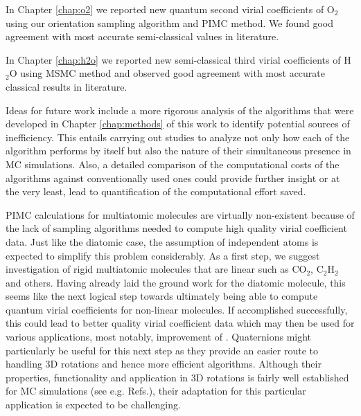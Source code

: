     In Chapter \ref{chap:o2} we reported new quantum second virial coefficients of O$_2$ using our orientation sampling algorithm and PIMC method. We found good agreement with most accurate semi-classical values in literature.

    In Chapter \ref{chap:h2o} we reported new semi-classical third virial coefficients of H$_2$O using MSMC method and observed good agreement with most accurate classical results in literature.

    Ideas for future work include a more rigorous analysis of the algorithms that were developed in Chapter \ref{chap:methods} of this work to identify potential sources of inefficiency. This entails carrying out studies to analyze not only how each of the algorithm performs by itself but also the nature of their simultaneous presence in MC simulations. Also, a detailed comparison of the computational costs of the algorithms against conventionally used ones could provide further insight or at the very least, lead to quantification of the computational effort saved.
    
    PIMC calculations for multiatomic molecules are virtually non-existent because of the lack of sampling algorithms needed to compute high quality virial coefficient data. Just like the diatomic case, the assumption of independent atoms is expected to simplify this problem considerably. As a first step, we suggest investigation of rigid multiatomic molecules that are linear such as CO$_2$, C$_2$H$_2$ and others. Having already laid the ground work for the diatomic molecule, this seems like the next logical step towards ultimately being able to compute quantum virial coefficients for non-linear molecules. If accomplished successfully, this could lead to better quality virial coefficient data which may then be used for various applications, most notably, improvement of \abinitio{} \PESs{}. Quaternions might particularly be useful for this next step as they provide an easier route to handling 3D rotations and hence more efficient algorithms. Although their properties, functionality and application in 3D rotations is fairly well established for MC simulations (see e.g. Refs.\cite{Karney2007,Sinkovits2012}), their adaptation for this particular application is expected to be challenging.
